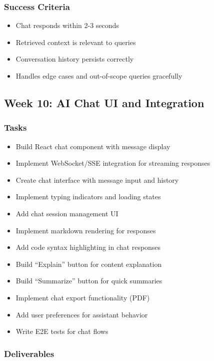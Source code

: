 \documentclass[12pt,oneside]{report}
\begin{document}
\subsubsection{Success Criteria}

\begin{itemize}
    \item Chat responds within 2-3 seconds
    \item Retrieved context is relevant to queries
    \item Conversation history persists correctly
    \item Handles edge cases and out-of-scope queries gracefully
\end{itemize}

\subsection{Week 10: AI Chat UI and Integration}

\subsubsection{Tasks}

\begin{itemize}
    \item Build React chat component with message display
    \item Implement WebSocket/SSE integration for streaming responses
    \item Create chat interface with message input and history
    \item Implement typing indicators and loading states
    \item Add chat session management UI
    \item Implement markdown rendering for responses
    \item Add code syntax highlighting in chat responses
    \item Build ``Explain'' button for content explanation
    \item Build ``Summarize'' button for quick summaries
    \item Implement chat export functionality (PDF)
    \item Add user preferences for assistant behavior
    \item Write E2E tests for chat flows
\end{itemize}

\subsubsection{Deliverables}
\end{document}
